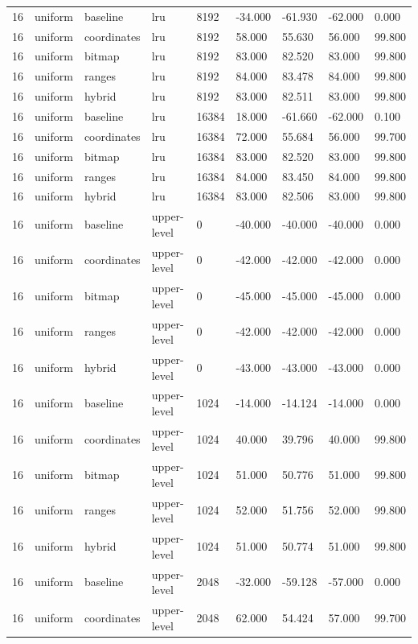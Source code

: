 \begin{tabular}{lllllllll}
16 & uniform & baseline & lru & 8192 & -34.000 & -61.930 & -62.000 & 0.000 \\
16 & uniform & coordinates & lru & 8192 & 58.000 & 55.630 & 56.000 & 99.800 \\
16 & uniform & bitmap & lru & 8192 & 83.000 & 82.520 & 83.000 & 99.800 \\
16 & uniform & ranges & lru & 8192 & 84.000 & 83.478 & 84.000 & 99.800 \\
16 & uniform & hybrid & lru & 8192 & 83.000 & 82.511 & 83.000 & 99.800 \\
16 & uniform & baseline & lru & 16384 & 18.000 & -61.660 & -62.000 & 0.100 \\
16 & uniform & coordinates & lru & 16384 & 72.000 & 55.684 & 56.000 & 99.700 \\
16 & uniform & bitmap & lru & 16384 & 83.000 & 82.520 & 83.000 & 99.800 \\
16 & uniform & ranges & lru & 16384 & 84.000 & 83.450 & 84.000 & 99.800 \\
16 & uniform & hybrid & lru & 16384 & 83.000 & 82.506 & 83.000 & 99.800 \\
16 & uniform & baseline & upper-level & 0 & -40.000 & -40.000 & -40.000 & 0.000 \\
16 & uniform & coordinates & upper-level & 0 & -42.000 & -42.000 & -42.000 & 0.000 \\
16 & uniform & bitmap & upper-level & 0 & -45.000 & -45.000 & -45.000 & 0.000 \\
16 & uniform & ranges & upper-level & 0 & -42.000 & -42.000 & -42.000 & 0.000 \\
16 & uniform & hybrid & upper-level & 0 & -43.000 & -43.000 & -43.000 & 0.000 \\
16 & uniform & baseline & upper-level & 1024 & -14.000 & -14.124 & -14.000 & 0.000 \\
16 & uniform & coordinates & upper-level & 1024 & 40.000 & 39.796 & 40.000 & 99.800 \\
16 & uniform & bitmap & upper-level & 1024 & 51.000 & 50.776 & 51.000 & 99.800 \\
16 & uniform & ranges & upper-level & 1024 & 52.000 & 51.756 & 52.000 & 99.800 \\
16 & uniform & hybrid & upper-level & 1024 & 51.000 & 50.774 & 51.000 & 99.800 \\
16 & uniform & baseline & upper-level & 2048 & -32.000 & -59.128 & -57.000 & 0.000 \\
16 & uniform & coordinates & upper-level & 2048 & 62.000 & 54.424 & 57.000 & 99.700 \\

\end{tabular}
